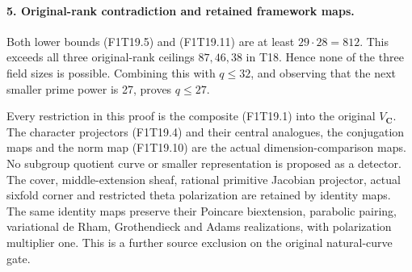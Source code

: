 \paragraph{5. Original-rank contradiction and retained framework maps.}
Both lower bounds (F1T19.5) and (F1T19.11) are at
least \(29\cdot28=812\). This exceeds all three
original-rank ceilings \(87,46,38\) in T18. Hence
none of the three field sizes is possible. Combining
this with \(q\le32\), and observing that the next
smaller prime power is 27, proves \(q\le27\).

Every restriction in this proof is the composite
(F1T19.1) into the original \(V_{\mathbf C}\).
The character projectors (F1T19.4) and their central
analogues, the conjugation maps and the norm map
(F1T19.10) are the actual dimension-comparison maps.
No subgroup quotient curve or smaller representation
is proposed as a detector. The cover, middle-extension
sheaf, rational primitive Jacobian projector, actual
sixfold corner and restricted theta polarization are
retained by identity maps. The same identity maps
preserve their Poincare biextension, parabolic pairing,
variational de Rham, Grothendieck and Adams realizations,
with polarization multiplier one. This is a further
source exclusion on the original natural-curve gate.
